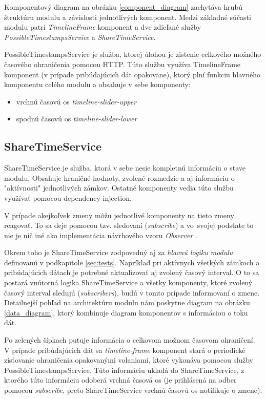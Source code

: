 \documentclass[
  digital, %
  twoside, %
  notable,   %
  nolof,   %
  nolot,   %
]{fithesis3}
\newcommand{\inquotes}[1]{{}"{}#1{}"{}}
\begin{document}
Komponentový diagram na obrázku \ref{component_diagram} zachytáva hrubú štruktúru modulu a závislosti jednotlivých komponent. Medzi základné súčasti modulu patrí \textit{TimelineFrame} komponent a dve zdieľané služby \textit{PossibleTimestampsService} a \textit{ShareTimeService}.

PossibleTimestampsService je služba, ktorej úlohou je zistenie celkového možného časového ohraničenia pomocou HTTP. Túto službu využíva TimelineFrame komponent (v prípade pribúdajúcich dát opakovane), ktorý plní funkciu hlavného komponentu celého modulu a obsahuje v sebe komponenty:
\begin{itemize}
\item vrchnú časovú os \textit{timeline-slider-upper}
\item spodnú časovú os \textit{timeline-slider-lower}
\end{itemize}

\subsection{ShareTimeService}
ShareTimeService je služba, ktorá v sebe nesie kompletnú informáciu o stave modulu. Obsahuje hraničné hodnoty, zvolené rozmedzie a aj informáciu o \inquotes{aktívnosti} jednotlivých zámkov. Ostatné komponenty vedia túto službu využívať pomocou dependency injection.

V prípade akejkoľvek zmeny môžu jednotlivé komponenty na tieto zmeny reagovať. To sa deje pomocou tzv. sledovaní (\textit{subscribe}) a vo~svojej podstate to nie je nič iné ako implementácia návrhového vzoru \textit{Observer} \cite{rhrjjv1994elements}.

Okrem toho je ShareTimeService zodpovedný aj za \textit{hlavnú logiku modulu} definovanú v podkapitole \ref{sec:tests}. Napríklad pri aktívnych všetkých zámkoch a pribúdajúcich dátach je potrebné aktualizovať aj zvolený časový interval. O to sa postará vnútorná logika ShareTimeService a všetky komponenty, ktoré zvolený časový interval sledujú (\textit{subscribers}), budú v tomto prípade informovaní o zmene. Detailnejší pohľad na architektúru modulu nám poskytne diagram na obrázku \ref{data_diagram}, ktorý kombinuje diagram komponentov s informáciou o toku dát.

Po zelených šípkach putuje informácia o celkovom možnom časovom ohraničení. V prípade pribúdajúcich dát sa \textit{timeline-frame} komponent stará o periodické zisťovanie ohraničenia opakovanými volaniami, ktoré vykonáva pomocou služby PossibleTimestampsService. Túto informáciu ukladá do ShareTimeService, z ktorého túto informáciu odoberá vrchná časová os (je prihlásená na odber pomocou \textit{subscribe}, preto ShareTimeService vrchnú časovú os notifikuje o zmene).
\end{document}

